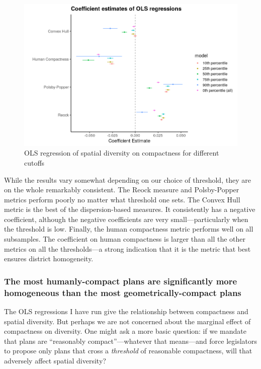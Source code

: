 \documentclass[]{article}
\begin{document}
\begin{figure}
\centering
\includegraphics{../30_results/regression_coefficients_all.png}
\caption{OLS regression of spatial diversity on compactness for
different cutoffs \label{cutoffs}}
\end{figure}

While the results vary somewhat depending on our choice of threshold,
they are on the whole remarkably consistent. The Reock measure and
Polsby-Popper metrics perform poorly no matter what threshold one sets.
The Convex Hull metric is the best of the dispersion-based measures. It
consistently has a negative coefficient, although the negative
coefficients are very small---particularly when the threshold is low.
Finally, the human compactness metric performs well on all subsamples.
The coefficient on human compactness is larger than all the other
metrics on all the thresholds---a strong indication that it is the
metric that best ensures district homogeneity.

\hypertarget{the-most-humanly-compact-plans-are-significantly-more-homogeneous-than-the-most-geometrically-compact-plans}{%
\subsubsection{The most humanly-compact plans are significantly more
homogeneous than the most geometrically-compact
plans}\label{the-most-humanly-compact-plans-are-significantly-more-homogeneous-than-the-most-geometrically-compact-plans}}

The OLS regressions I have run give the relationship between compactness
and spatial diversity. But perhaps we are not concerned about the
marginal effect of compactness on diversity. One might ask a more basic
question: if we mandate that plans are ``reasonably compact''---whatever
that means---and force legislators to propose only plans that cross a
\emph{threshold} of reasonable compactness, will that adversely affect
spatial diversity?
\end{document}
